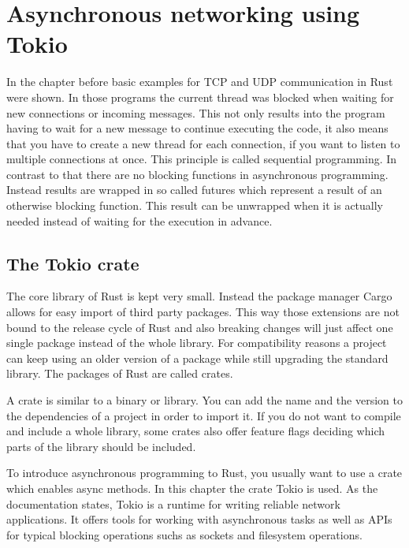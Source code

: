
\section{Asynchronous networking using Tokio}
In the chapter before basic examples for TCP and UDP communication in Rust were shown. In those programs the current
thread was blocked when waiting for new connections or incoming messages. This not only results into the program having
to wait for a new message to continue executing the code, it also means that you have to create a new thread for each
connection, if you want to listen to multiple connections at once. This principle is called sequential programming. In
contrast to that there are no blocking functions in asynchronous programming. Instead results are wrapped in so called
futures which represent a result of an otherwise blocking function. This result can be unwrapped when it is actually
needed instead of waiting for the execution in advance. \cite{c18network}

\subsection{The Tokio crate}
The core library of Rust is kept very small. Instead the package manager Cargo allows for easy import of third party
packages. This way those extensions are not bound to the release cycle of Rust and also breaking changes will just
affect one single package instead of the whole library. For compatibility reasons a project can keep using an older
version of a package while still upgrading the standard library. The packages of Rust are called crates.

A crate is similar to a binary or library. You can add the name and the version to the dependencies of a project in
order to import it. If you do not want to compile and include a whole library, some crates also offer feature flags
deciding which parts of the library should be included.

To introduce asynchronous programming to Rust, you usually want to use a crate which enables async methods. In this
chapter the crate Tokio is used. As the documentation \cite{tokio-doc} states, Tokio is a runtime for writing
reliable network applications. It offers tools for working with asynchronous tasks as well as APIs for typical blocking
operations suchs as sockets and filesystem operations.

